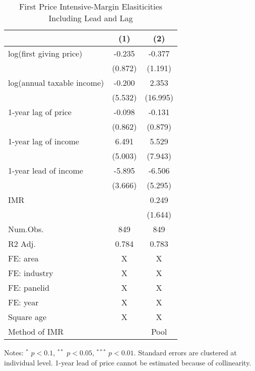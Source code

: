 \documentclass[
  11pt,
  a4paper,
]{article}
\begin{document}
\begin{table}

\caption{\label{tab:leadlagbenchmark}First Price Intensive-Margin Elasiticities Including Lead and Lag}
\centering
\fontsize{9}{11}\selectfont
\begin{threeparttable}
\begin{tabular}[t]{lcc}
\toprule
  & (1) & (2)\\
\midrule
log(first giving price) & -0.235 & -0.377\\
 & (0.872) & (1.191)\\
log(annual taxable income) & -0.200 & 2.353\\
 & (5.532) & (16.995)\\
1-year lag of price & -0.098 & -0.131\\
 & (0.862) & (0.879)\\
1-year lag of income & 6.491 & 5.529\\
 & (5.003) & (7.943)\\
1-year lead of income & -5.895 & -6.506\\
 & (3.666) & (5.295)\\
IMR &  & 0.249\\
 &  & (1.644)\\
\midrule
Num.Obs. & 849 & 849\\
R2 Adj. & 0.784 & 0.783\\
FE: area & X & X\\
FE: industry & X & X\\
FE: panelid & X & X\\
FE: year & X & X\\
Square age & X & X\\
Method of IMR &  & Pool\\
\bottomrule
\end{tabular}
\begin{tablenotes}
\item Notes: $^{*}$ $p < 0.1$, $^{**}$ $p < 0.05$, $^{***}$ $p < 0.01$. Standard errors are clustered at individual level. 1-year lead of price cannot be estimated because of collinearity.
\end{tablenotes}
\end{threeparttable}
\end{table}
\end{document}
